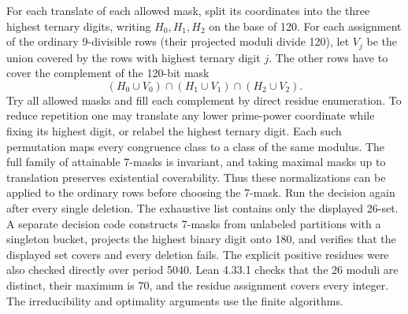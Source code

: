 For each translate of each allowed mask, split its coordinates into the three highest ternary digits, writing $H_0,H_1,H_2$ on the base of 120. For each assignment of the ordinary 9-divisible rows (their projected moduli divide 120), let $V_j$ be the union covered by the rows with highest ternary digit $j$. The other rows have to cover the complement of the 120-bit mask
\[
                 (H_0\cup V_0)\cap(H_1\cup V_1)\cap(H_2\cup V_2).
\]
Try all allowed masks and fill each complement by direct residue enumeration. To reduce repetition one may translate any lower prime-power coordinate while fixing its highest digit, or relabel the highest ternary digit. Each such permutation maps every congruence class to a class of the same modulus. The full family of attainable 7-masks is invariant, and taking maximal masks up to translation preserves existential coverability. Thus these normalizations can be applied to the ordinary rows before choosing the 7-mask. Run the decision again after every single deletion. The exhaustive list contains only the displayed 26-set. A separate decision code constructs 7-masks from unlabeled partitions with a singleton bucket, projects the highest binary digit onto 180, and verifies that the displayed set covers and every deletion fails. The explicit positive residues were also checked directly over period 5040. Lean 4.33.1 checks that the 26 moduli are distinct, their maximum is 70, and the residue assignment covers every integer. The irreducibility and optimality arguments use the finite algorithms.
